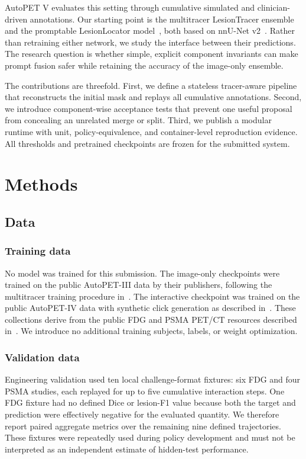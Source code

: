 \documentclass[runningheads]{llncs}
\begin{document}
AutoPET V evaluates this setting through cumulative simulated and
clinician-driven annotations. Our starting point is the multitracer
LesionTracer ensemble~\cite{rokuss2024multitracer} and the promptable
LesionLocator model~\cite{rokuss2025interactive}, both based on nnU-Net
v2~\cite{isensee2021nnunet}. Rather than retraining either network, we study the
interface between their predictions. The research question is whether simple,
explicit component invariants can make prompt fusion safer while retaining the
accuracy of the image-only ensemble.

The contributions are threefold. First, we define a stateless tracer-aware
pipeline that reconstructs the initial mask and replays all cumulative
annotations. Second, we introduce component-wise acceptance tests that prevent
one useful proposal from concealing an unrelated merge or split. Third, we
publish a modular runtime with unit, policy-equivalence, and container-level
reproduction evidence. All thresholds and pretrained checkpoints are frozen
for the submitted system.

\section{Methods}

\subsection{Data}

\subsubsection{Training data}
No model was trained for this submission. The image-only checkpoints were
trained on the public AutoPET-III data by their publishers, following the
multitracer training procedure in~\cite{rokuss2024multitracer}. The
interactive checkpoint was trained on the public AutoPET-IV data with
synthetic click generation as described in~\cite{rokuss2025interactive}.
These collections derive from the public FDG and PSMA PET/CT resources
described in~\cite{gatidis2022fdg,jeblick2024psma}. We introduce no additional
training subjects, labels, or weight optimization.

\subsubsection{Validation data}
Engineering validation used ten local challenge-format fixtures: six FDG and
four PSMA studies, each replayed for up to five cumulative interaction steps.
One FDG fixture had no defined Dice or lesion-F1 value because both the target
and prediction were effectively negative for the evaluated quantity. We
therefore report paired aggregate metrics over the remaining nine defined
trajectories. These fixtures were repeatedly used during policy development
and must not be interpreted as an independent estimate of hidden-test
performance.
\end{document}
